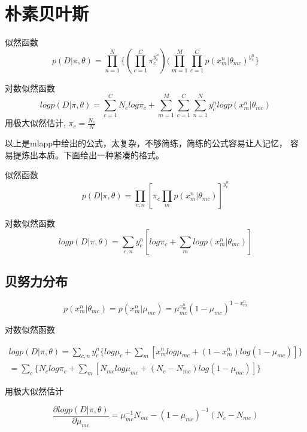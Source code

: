 \section{朴素贝叶斯}
似然函数
\begin{equation}
p(D|\pi, \theta) = \prod_{n=1}^N\{
(\prod_{c=1}^C\pi_c^{y_c^n})
(\prod_{m=1}^M\prod_{c=1}^Cp(x_m^n|\theta_{mc})^{y_c^n}
\}
\end{equation}

对数似然函数
\begin{equation}
logp(D|\pi, \theta) = \sum_{c=1}^CN_clog\pi_c
+ \sum_{m=1}^M\sum_{c=1}^C\sum_{n=1}^Ny_c^nlogp(x_m^n|\theta_{mc})
\end{equation}
用极大似然估计, $\pi_c = \frac{N_c}{N}$

以上是mlapp中给出的公式，太复杂，不够简练，简练的公式容易让人记忆，
容易提炼出本质。下面给出一种紧凑的格式。

似然函数
\begin{equation}
p(D|\pi, \theta) = \prod_{c,n}
[\pi_c\prod_mp(x_m^n|\theta_{mc})]^{y_c^n}
\end{equation}

对数似然函数
\begin{equation}
logp(D|\pi, \theta) = \sum_{c, n}y_c^n
[log\pi_c + \sum_mlogp(x_m^n|\theta_{mc})]
\end{equation}
\subsection{贝努力分布}

\begin{equation}
p(x_m^n|\theta_{mc}) = p(x_m^n|\mu_{mc})
= \mu_{mc}^{x_m^n}(1 - \mu_{mc})^{1 - x_m^n}
\end{equation}

对数似然函数

\begin{equation}
\begin{aligned}
logp(D|\pi, \theta) = \sum_{c,n}
y_c^n\{log\mu_c + \sum_m[x_m^nlog\mu_{mc} + (1 - x_m^n)
log(1 - \mu_{mc})]\}
\\= \sum_c\{
N_clog\pi_c + \sum_m[N_{mc}log\mu_{mc} 
+ (N_c - N_{mc})log(1-\mu_{mc})]
\}
\end{aligned}
\end{equation}

用极大似然估计

\begin{equation}
\frac{\partial logp(D|\pi, \theta)} {\partial \mu_{mc}}
= \mu^{-1}_{mc}N_{mc} - (1 - \mu_{mc})^{-1}(N_c - N_{mc})
\end{equation}

